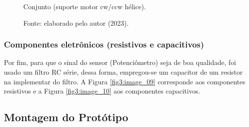 \begin{figure}[!h]
	\centering
	\caption{Conjunto (suporte motor cw/ccw hélice).}
	\caption*{Fonte: elaborado pelo autor (2023).}
	\label{fig3:image_08}
\end{figure}

\newpage
\subsubsection{Componentes eletrônicos (resistivos e capacitivos)}

Por fim, para que o sinal do sensor (Potenciômetro) seja de boa qualidade, foi usado um filtro RC série, dessa forma, empregou-se um capacitor de um resistor na implementar do filtro. A Figura \ref{fig3:image_09} corresponde aos componentes resistivos e a Figura \ref{fig3:image_10} aos componentes capacitivos.



\subsection{Montagem do Protótipo}

